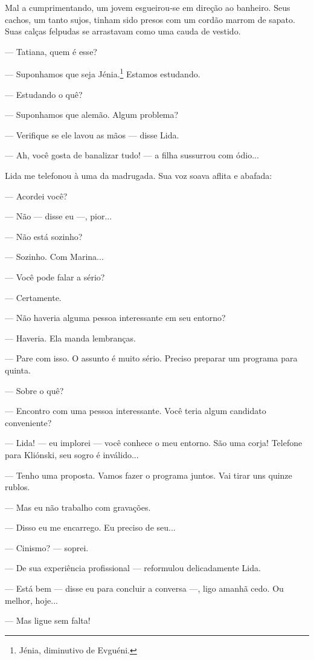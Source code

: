 Mal a cumprimentando, um jovem esgueirou-se em direção ao banheiro. Seus
cachos, um tanto sujos, tinham sido presos com um cordão marrom de
sapato. Suas calças felpudas se arrastavam como uma cauda de vestido.

--- Tatiana, quem é esse?

--- Suponhamos que seja Jénia.\footnote{Jénia, diminutivo de Evguéni.}
Estamos estudando.

--- Estudando o quê?

--- Suponhamos que alemão. Algum problema?

--- Verifique se ele lavou as mãos --- disse Lida.

--- Ah, você gosta de banalizar tudo! --- a filha sussurrou com ódio...

Lida me telefonou à uma da madrugada. Sua voz soava aflita e abafada:

--- Acordei você?

--- Não --- disse eu ---, pior...

--- Não está sozinho?

--- Sozinho. Com Marina...

--- Você pode falar a sério?

--- Certamente.

--- Não haveria alguma pessoa interessante em seu entorno?

--- Haveria. Ela manda lembranças.

--- Pare com isso. O assunto é muito sério. Preciso preparar um programa
para quinta.

--- Sobre o quê?

--- Encontro com uma pessoa interessante. Você teria algum candidato
conveniente?

--- Lida! --- eu implorei --- você conhece o meu entorno. São uma corja!
Telefone para Kliónski, seu sogro é inválido...

--- Tenho uma proposta. Vamos fazer o programa juntos. Vai tirar uns
quinze rublos.

--- Mas eu não trabalho com gravações.

--- Disso eu me encarrego. Eu preciso de seu...

--- Cinismo? --- soprei.

--- De sua experiência profissional --- reformulou delicadamente Lida.

--- Está bem --- disse eu para concluir a conversa ---, ligo amanhã
cedo. Ou melhor, hoje...

--- Mas ligue sem falta!

